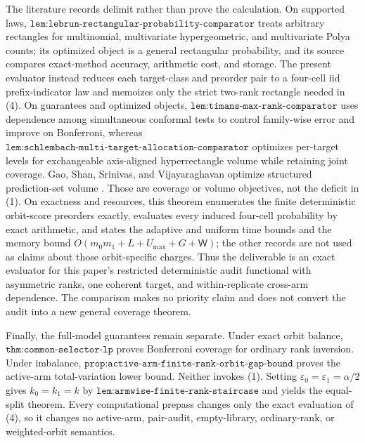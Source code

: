 The literature records delimit rather than prove the calculation. On supported laws, \(\texttt{lem:lebrun-rectangular-probability-comparator}\) treats arbitrary rectangles for multinomial, multivariate hypergeometric, and multivariate Polya counts; its optimized object is a general rectangular probability, and its source compares exact-method accuracy, arithmetic cost, and storage. The present evaluator instead reduces each target-class and preorder pair to a four-cell iid prefix-indicator law and memoizes only the strict two-rank rectangle needed in (4). On guarantees and optimized objects, \(\texttt{lem:timans-max-rank-comparator}\) uses dependence among simultaneous conformal tests to control family-wise error and improve on Bonferroni, whereas \(\texttt{lem:schlembach-multi-target-allocation-comparator}\) optimizes per-target levels for exchangeable axis-aligned hyperrectangle volume while retaining joint coverage. Gao, Shan, Srinivas, and Vijayaraghavan optimize structured prediction-set volume \cite{GaoShanSrinivasVijayaraghavan2025}. Those are coverage or volume objectives, not the deficit in (1). On exactness and resources, this theorem enumerates the finite deterministic orbit-score preorders exactly, evaluates every induced four-cell probability by exact arithmetic, and states the adaptive and uniform time bounds and the memory bound \(O(m_0m_1+L+U_{\max}+G+\mathsf W)\); the other records are not used as claims about those orbit-specific charges. Thus the deliverable is an exact evaluator for this paper's restricted deterministic audit functional with asymmetric ranks, one coherent target, and within-replicate cross-arm dependence. The comparison makes no priority claim and does not convert the audit into a new general coverage theorem.

Finally, the full-model guarantees remain separate. Under exact orbit balance, \(\texttt{thm:common-selector-lp}\) proves Bonferroni coverage for ordinary rank inversion. Under imbalance, \(\texttt{prop:active-arm-finite-rank-orbit-gap-bound}\) proves the active-arm total-variation lower bound. Neither invokes (1). Setting \(\varepsilon_0=\varepsilon_1=\alpha/2\) gives \(k_0=k_1=k\) by \(\texttt{lem:armwise-finite-rank-staircase}\) and yields the equal-split theorem. Every computational prepass changes only the exact evaluation of (4), so it changes no active-arm, pair-audit, empty-library, ordinary-rank, or weighted-orbit semantics.